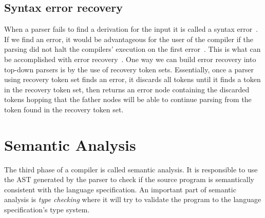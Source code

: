 \documentclass[
  oneside,
  english,
  coorientadorbanca,
  embeddedlogo,
  noabntexcite
]{ufsc-thesis-rn46-2019}
\def\ppp{::=}
\newcommand{\code}[1]{\texttt{#1}}
\newcommand{\bnfvar}[1]{\ \bnfvars{#1}}
\newcommand{\bnfvars}[1]{\code{#1}}
\newcommand{\bnfter}[1]{\ \bnfters{#1}}
\newcommand{\bnfters}[1]{\textrm{`}\code{#1}\textrm{'}}
\newcommand{\bnfprod}[2]{\bnfvars{#1} &\ &\ppp& #2}
\newcommand{\bnfmore}[1]{ && \mid{} & #1}
\begin{document}
\subsection{Syntax error recovery}

When a parser fails to find a derivation for the input it is called a syntax error~\cite{appel2003modern}.
If we find an error, it would be advantageous for the user of the compiler if the parsing did not halt the compilers' execution on the first error~\cite{appel2003modern}.
This is what can be accomplished with error recovery~\cite{appel2003modern}.
One way we can build error recovery into top-down parsers is by the use of recovery token sets.
Essentially, once a parser using recovery token set finds an error, it discards all tokens until it finds a token in the recovery token set, then returns an error node containing the discarded tokens hopping that the father nodes will be able to continue parsing from the token found in the recovery token set.

\section{Semantic Analysis}\label{chapter:background:sec:semantic}

The third phase of a compiler is called semantic analysis.
It is responsible to use the AST generated by the parser to check if the source program is semantically consistent with the language specification.
An important part of semantic analysis is \textit{type checking} where it will try to validate the program to the language specification's type system.

\end{document}
